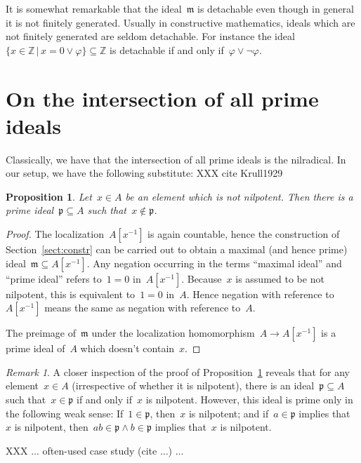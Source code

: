 \documentclass[12pt,oneside,reqno]{amsart}
\theoremstyle{definition}
\theoremstyle{plain}
\newtheorem{prop}[defn]{Proposition}
\theoremstyle{remark}
\newtheorem{rem}[defn]{Remark}
\newcommand{\mmm}{\mathfrak{m}}
\newcommand{\ppp}{\mathfrak{p}}
\newcommand{\ZZ}{\mathbb{Z}}
\renewcommand{\_}{\mathpunct{.}\,}
\begin{document}
It is somewhat remarkable that the ideal~$\mmm$ is detachable even though in
general it is not finitely generated. Usually in constructive mathematics, ideals which are not
finitely generated are seldom detachable. For instance the ideal~$\{ x \in
\ZZ \,|\, x = 0 \vee \varphi \} \subseteq \ZZ$ is detachable if and only
if~$\varphi \vee \neg\varphi$.


\section{On the intersection of all prime ideals}

Classically, we have that the intersection of all prime ideals is the
nilradical. In our setup, we have the following substitute:
XXX cite Krull1929

\begin{prop}\label{prop:nilp-prime}Let~$x \in A$ be an element which is not nilpotent. Then there is a
prime ideal~$\ppp \subseteq A$ such that~$x \not\in \ppp$.
\end{prop}

\begin{proof}The localization~$A[x^{-1}]$ is again countable, hence the
construction of Section~\ref{sect:constr} can be carried out to obtain a
maximal (and hence prime) ideal~$\mmm \subseteq A[x^{-1}]$. Any negation
occurring in the terms ``maximal ideal'' and ``prime ideal'' refers to~$1 = 0$
in~$A[x^{-1}]$. Because~$x$ is assumed to be not nilpotent, this is equivalent
to~$1 = 0$ in~$A$. Hence negation with reference to~$A[x^{-1}]$ means the same
as negation with reference to~$A$.

The preimage of~$\mmm$ under the localization homomorphism~$A \to A[x^{-1}]$ is
a prime ideal of~$A$ which doesn't contain~$x$.
\end{proof}

\begin{rem}A closer inspection of the proof of
Proposition~\ref{prop:nilp-prime} reveals that for any element~$x \in A$
(irrespective of whether it is nilpotent), there is an ideal~$\ppp \subseteq A$
such that~$x \in \ppp$ if and only if~$x$ is nilpotent. However, this ideal is
prime only in the following weak sense: If~$1 \in \ppp$, then~$x$ is nilpotent;
and if~$a \in \ppp$ implies that~$x$ is nilpotent, then~$ab \in \ppp \wedge b
\in \ppp$ implies that~$x$ is nilpotent.
\end{rem}

XXX ... often-used case study (cite ...) ...
\end{document}
